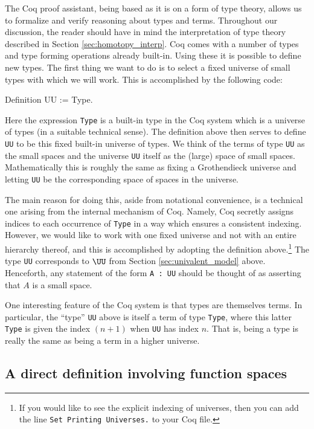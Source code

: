 The Coq proof assistant, being based as it is on a form of type
theory, allows us to formalize and verify reasoning about types and
terms.  Throughout our discussion, the reader should have in mind the
interpretation of type theory described in Section
\ref{sec:homotopy_interp}.  Coq comes with a number of types and
type forming operations already built-in.  Using these it is possible
to define new types.  The first thing we want to do is to select a
fixed universe of small types with which we will work.  This is
accomplished by the following code:
\begin{center}
  \begin{coqcode}
Definition UU := Type.
  \end{coqcode}
\end{center}
Here the expression \verb|Type| is a built-in type in the Coq
system which is a universe of types (in a suitable technical sense).
The definition above then serves to define \verb|UU| to be this
fixed built-in universe of types.  We think of the terms of type
\verb|UU| as the small spaces and the universe \verb|UU|
itself as the (large) space of small spaces.
Mathematically this is roughly the same as fixing a Grothendieck
universe and letting \verb|UU| be the corresponding space of
spaces in the universe.  

The main reason for doing this, aside from notational convenience, is
a technical one arising from the internal
mechanism of Coq.  Namely, Coq secretly assigns indices to each
occurrence of \verb|Type| in a way which ensures a consistent
indexing.  However, we would like to work with one fixed universe and
not with an entire hierarchy thereof, and this is accomplished by
adopting the definition above.\footnote{If you would like to see the
  explicit indexing of universes, then you can add the line
  {\texttt{Set Printing Universes.}} to your Coq file.}  
The type \verb|UU| corresponds to $\UU$ from Section
\ref{sec:univalent_model} above.  Henceforth, any
statement of the form \verb|A : UU| should be thought of as
asserting that $A$ is a small space.

One interesting feature of the Coq system is that types are themselves
terms.  In particular, the ``type'' \verb|UU| above is itself a term of type \verb|Type|, where
this latter \verb|Type| is given the index $(n+1)$ when
\verb|UU| has index $n$. That is, being a type is really the same as being
a term in a higher universe.

\subsection{A direct definition involving function spaces}\label{sec:direct_def}

